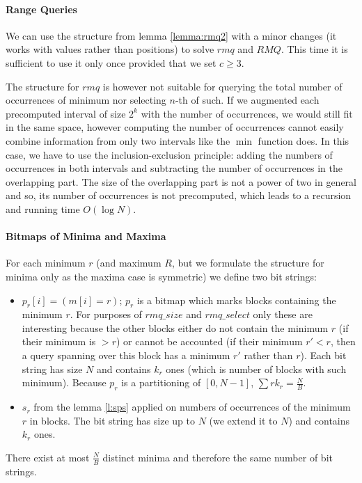 \paragraph{Range Queries}

We can use the structure from lemma \ref{lemma:rmq2} with a minor changes (it works with values rather than positions) to solve $rmq$ and $RMQ$.
This time it is sufficient to use it only once provided that we set $c \ge 3$.

The structure for $rmq$ is however not suitable for querying the total number of occurrences of minimum nor selecting $n$-th of such.
If we augmented each precomputed interval of size $2^k$ with the number of occurrences, we would still fit in the same space, however computing the number of occurrences cannot easily combine information from only two intervals like the $\min$ function does.
In this case, we have to use the inclusion-exclusion principle: adding the numbers of occurrences in both intervals and subtracting the number of occurrences in the overlapping part.
The size of the overlapping part is not a power of two in general and so, its number of occurrences is not precomputed, which leads to a recursion and running time $O(\log N)$.

\paragraph{Bitmaps of Minima and Maxima}

For each minimum $r$ (and maximum $R$, but we formulate the structure for minima only as the maxima case is symmetric) we define two bit strings:
\begin{itemize}
	\item $p_r[i] = (m[i] = r)$; $p_r$ is a bitmap which marks blocks containing the minimum $r$.
	For purposes of $rmq\_size$ and $rmq\_select$ only these are interesting because the other blocks either do not contain the minimum $r$ (if their minimum is $> r$) or cannot be accounted (if their minimum $r' < r$, then a query spanning over this block has a minimum $r'$ rather than $r$).
	Each bit string has size $N$ and contains $k_r$ ones (which is number of blocks with such minimum).
	Because $p_r$ is a partitioning of $[0, N - 1]$, $\sum{r} k_r = \frac{N}{B}$.
	\item $s_r$ from the lemma \ref{l:sps} applied on numbers of occurrences of the minimum $r$ in blocks.
	The bit string has size up to $N$ (we extend it to $N$) and contains $k_r$ ones.
\end{itemize}
There exist at most $\frac{N}{B}$ distinct minima and therefore the same number of bit strings.

